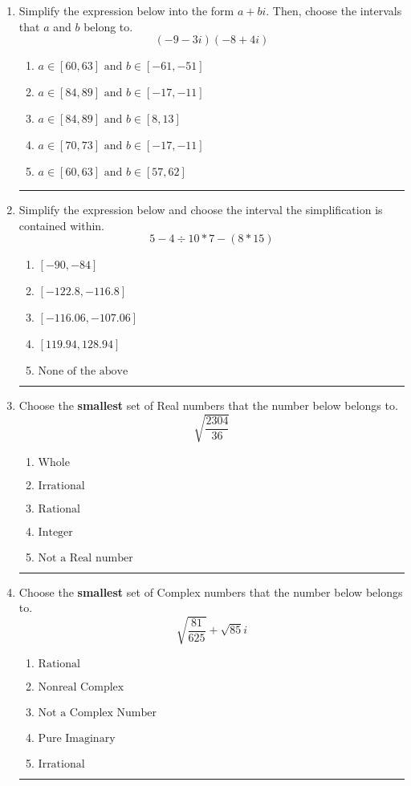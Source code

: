 \documentclass[14pt]{extbook}
\newcommand{\litem}[1]{\item#1\hspace*{-1cm}\rule{\textwidth}{0.4pt}}
\begin{document}
\begin{enumerate}
\litem{
Simplify the expression below into the form $a+bi$. Then, choose the intervals that $a$ and $b$ belong to.\[ (-9 - 3 i)(-8 + 4 i) \]\begin{enumerate}[label=\Alph*.]
\item \( a \in [60, 63] \text{ and } b \in [-61, -51] \)
\item \( a \in [84, 89] \text{ and } b \in [-17, -11] \)
\item \( a \in [84, 89] \text{ and } b \in [8, 13] \)
\item \( a \in [70, 73] \text{ and } b \in [-17, -11] \)
\item \( a \in [60, 63] \text{ and } b \in [57, 62] \)

\end{enumerate} }
\litem{
Simplify the expression below and choose the interval the simplification is contained within.\[ 5 - 4 \div 10 * 7 - (8 * 15) \]\begin{enumerate}[label=\Alph*.]
\item \( [-90, -84] \)
\item \( [-122.8, -116.8] \)
\item \( [-116.06, -107.06] \)
\item \( [119.94, 128.94] \)
\item \( \text{None of the above} \)

\end{enumerate} }
\litem{
Choose the \textbf{smallest} set of Real numbers that the number below belongs to.\[ \sqrt{\frac{2304}{36}} \]\begin{enumerate}[label=\Alph*.]
\item \( \text{Whole} \)
\item \( \text{Irrational} \)
\item \( \text{Rational} \)
\item \( \text{Integer} \)
\item \( \text{Not a Real number} \)

\end{enumerate} }
\litem{
Choose the \textbf{smallest} set of Complex numbers that the number below belongs to.\[ \sqrt{\frac{81}{625}}+\sqrt{85} i \]\begin{enumerate}[label=\Alph*.]
\item \( \text{Rational} \)
\item \( \text{Nonreal Complex} \)
\item \( \text{Not a Complex Number} \)
\item \( \text{Pure Imaginary} \)
\item \( \text{Irrational} \)


\end{enumerate}}
\end{enumerate}
\end{document}

